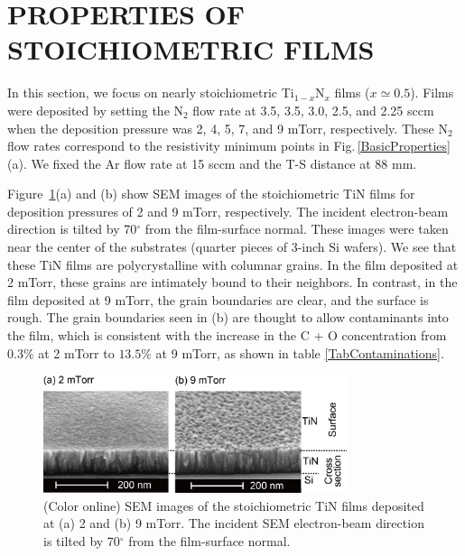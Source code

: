 \section{PROPERTIES OF STOICHIOMETRIC FILMS}
\label{PROPERTIES OF STOICHIOMETRIC FILMS}

In this section, we focus on nearly stoichiometric Ti$_{1-x}$N$_{x}$ films ($x \simeq 0.5$).  Films were deposited by setting the N$_{2}$ flow rate at 3.5, 3.5, 3.0, 2.5, and 2.25 sccm when the deposition pressure was 2, 4, 5, 7, and 9 mTorr, respectively. These N$_{2}$ flow rates correspond to the resistivity minimum points in Fig.\,\ref{BasicProperties}(a). We fixed the Ar flow rate at 15 sccm and the T-S distance at 88 mm.

Figure \,\ref{SEM2-9}(a) and (b) show SEM images of the stoichiometric TiN films for deposition pressures of 2 and 9 mTorr, respectively. The incident electron-beam direction is tilted by 70$^{\circ}$ from the film-surface normal. These images were taken near the center of the substrates (quarter pieces of 3-inch Si wafers). We see that these TiN films are polycrystalline with columnar grains. In the film deposited at 2 mTorr, these grains are intimately bound to their neighbors. In contrast, in the film deposited at 9 mTorr, the grain boundaries are clear, and the surface is rough. The grain boundaries seen in (b) are thought to allow contaminants into the film, which is consistent with the increase in the C + O concentration from $0.3\%$ at 2 mTorr to $13.5\%$ at 9 mTorr, as shown in table \ref{TabContaminations}.

\begin{figure}
\begin{center}


\includegraphics[width=89mm]{SEM2-9.jpg}

\end{center}
\caption{(Color online) SEM images of the stoichiometric TiN films deposited at (a) 2 and (b) 9 mTorr. The incident SEM electron-beam direction is tilted by 70$^{\circ}$ from the film-surface normal.}
\label{SEM2-9}
\end{figure}

